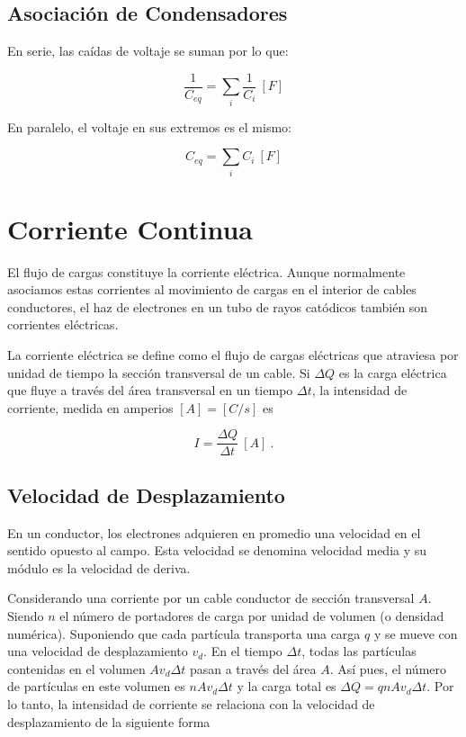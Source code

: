 \documentclass{tufte-handout}
\begin{document}
\subsection{Asociación de Condensadores}

En serie, las caídas de voltaje se suman por lo que:

\begin{equation}
\frac{1}{C_{eq}} = \sum_i \frac{1}{C_i}~[F]
\end{equation}

En paralelo, el voltaje en sus extremos es el mismo:

\begin{equation}
C_{eq} = \sum_i C_i~[F]
\end{equation}

\clearpage

\section{Corriente Continua}

El flujo de cargas constituye la corriente eléctrica. Aunque normalmente asociamos estas corrientes al movimiento de cargas en el interior de cables conductores, el haz de electrones en un tubo de rayos catódicos también son corrientes eléctricas.


La corriente eléctrica se define como el flujo de cargas eléctricas que atraviesa por unidad de tiempo la sección transversal de un cable. Si $\Delta Q$ es la carga eléctrica que fluye a través del área transversal en un tiempo $\Delta t$, la intensidad de corriente, medida en amperios $[A] = [C/s]$ es

\begin{equation}
I = \frac{\Delta Q}{\Delta t}~[A]~.
\end{equation}

\subsection{Velocidad de Desplazamiento}

En un conductor, los electrones adquieren en promedio una velocidad en el sentido opuesto al campo. Esta velocidad se denomina velocidad media y su módulo es la velocidad de deriva.

Considerando una corriente por un cable conductor de sección transversal $A$. Siendo $n$ el número de portadores de carga por unidad de volumen (o densidad numérica). Suponiendo que cada partícula transporta una carga $q$ y se mueve con una velocidad de desplazamiento $v_d$. En el tiempo $\Delta t$, todas las partículas contenidas en el volumen $Av_d\Delta t$ pasan a través del área $A$. Así pues, el número de partículas en este volumen es $nAv_d\Delta t$ y la carga total es $\Delta Q = qnAv_d\Delta t$. Por lo tanto, la intensidad de corriente se relaciona con la velocidad de desplazamiento de la siguiente forma
\end{document}
